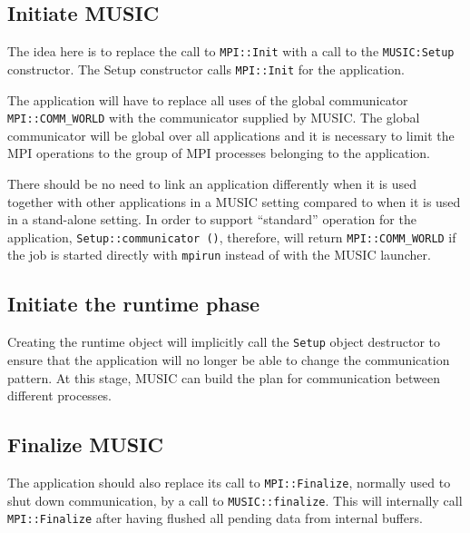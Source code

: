 \documentclass[a4paper,twoside]{report}
\begin{document}
\subsection{Initiate MUSIC}

The idea here is to replace the call to \lstinline|MPI::Init| with a
call to the \lstinline|MUSIC:Setup| constructor.  The Setup
constructor calls \lstinline|MPI::Init| for the application.

The application will have to replace all uses of the global
communicator \lstinline|MPI::COMM_WORLD| with the communicator
supplied by MUSIC.  The global communicator will be global over all
applications and it is necessary to limit the MPI operations to the
group of MPI processes belonging to the application.

There should be no need to link an application differently when it is
used together with other applications in a MUSIC setting compared to
when it is used in a stand-alone setting.  In order to support
``standard'' operation for the application,
\lstinline|Setup::communicator ()|, therefore, will return
\lstinline|MPI::COMM_WORLD| if the job is started directly with
\lstinline|mpirun| instead of with the MUSIC launcher.



\subsection{Initiate the runtime phase}

Creating the runtime object will implicitly call the \lstinline|Setup|
object destructor to ensure that the application will no longer be
able to change the communication pattern.  At this stage, MUSIC can
build the plan for communication between different processes.

\subsection{Finalize MUSIC}

The application should also replace its call to
\lstinline|MPI::Finalize|, normally used to shut down communication,
by a call to \lstinline|MUSIC::finalize|.  This will internally call
\lstinline|MPI::Finalize| after having flushed all pending data from
internal buffers.




\appendix
\end{document}
